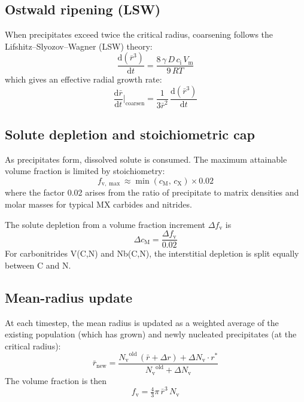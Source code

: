 \documentclass[11pt,a4paper]{article}
\newcommand{\fv}{\ensuremath{f_\mathrm{v}}}
\newcommand{\Nv}{\ensuremath{N_\mathrm{v}}}
\begin{document}
\subsection{Ostwald ripening (LSW)}

When precipitates exceed twice the critical radius, coarsening follows the
Lifshitz--Slyozov--Wagner (LSW) theory:
\begin{equation}
  \frac{\mathrm{d}(\bar r^3)}{\mathrm{d}t}
    = \frac{8\,\gamma\,D\,c_\mathrm{i}\,V_\mathrm{m}}{9\,RT}
  \label{eq:lsw}
\end{equation}
which gives an effective radial growth rate:
\begin{equation}
  \frac{\mathrm{d}\bar{r}}{\mathrm{d}t}\bigg|_\mathrm{coarsen}
    = \frac{1}{3\bar{r}^2}\,\frac{\mathrm{d}(\bar r^3)}{\mathrm{d}t}
\end{equation}

\subsection{Solute depletion and stoichiometric cap}

As precipitates form, dissolved solute is consumed.  The maximum attainable
volume fraction is limited by stoichiometry:
\begin{equation}
  f_{\mathrm{v},\max} \approx \min(c_\mathrm{M},\, c_\mathrm{X}) \times 0.02
  \label{eq:fvmax}
\end{equation}
where the factor 0.02 arises from the ratio of precipitate to matrix densities
and molar masses for typical MX carbides and nitrides.

The solute depletion from a volume fraction increment $\Delta\fv$ is
\begin{equation}
  \Delta c_\mathrm{M} = \frac{\Delta\fv}{0.02}
  \label{eq:depletion}
\end{equation}
For carbonitrides V(C,N) and Nb(C,N), the interstitial depletion is split
equally between C and N.

\subsection{Mean-radius update}

At each timestep, the mean radius is updated as a weighted average of the
existing population (which has grown) and newly nucleated precipitates (at the
critical radius):
\begin{equation}
  \bar{r}_\mathrm{new} = \frac{\Nv^\mathrm{old}\,(\bar{r} + \Delta r)
    + \Delta\Nv \cdot r^*}
    {\Nv^\mathrm{old} + \Delta\Nv}
  \label{eq:rmean}
\end{equation}
The volume fraction is then
\begin{equation}
  \fv = \tfrac{4}{3}\pi\,\bar{r}^3\,\Nv
  \label{eq:fv}
\end{equation}
\end{document}

